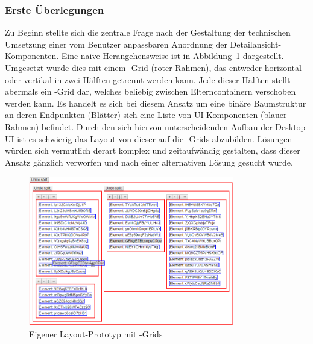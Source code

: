 \subsubsection{Erste Überlegungen}
Zu Beginn stellte sich die zentrale Frage nach der Gestaltung der technischen Umsetzung einer vom Benutzer anpassbaren Anordnung der Detailansicht-Komponenten. Eine naive Herangehensweise ist in Abbildung~\ref{fig:layout_grid_test} dargestellt. Umgesetzt wurde dies mit einem -Grid (roter Rahmen), das entweder horizontal oder vertikal in zwei Hälften getrennt werden kann. Jede dieser Hälften stellt abermals ein -Grid dar, welches beliebig zwischen Elterncontainern verschoben werden kann. Es handelt es sich bei diesem Ansatz um eine binäre Baumstruktur an deren Endpunkten (Blätter) sich eine Liste von UI-Komponenten (blauer Rahmen) befindet. Durch den sich hiervon unterscheidenden Aufbau der Desktop-UI ist es schwierig das Layout von dieser auf die -Grids abzubilden. Lösungen würden sich vermutlich derart komplex und zeitaufwändig gestalten, dass dieser Ansatz gänzlich verworfen und nach einer alternativen Lösung gesucht wurde.

\begin{figure}
    \centering
    \captionsetup{justification=centering}
    \includegraphics[width=0.8\textwidth]{figures/layout_grid_test.png}
        \caption{Eigener Layout-Prototyp mit -Grids}\label{fig:layout_grid_test}
\end{figure}

